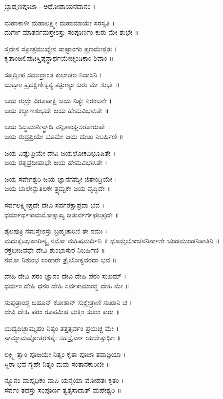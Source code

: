 ಬ್ರಾಹ್ಮಣಪೂಜಾ - ಅಥೋಪಾಯನದಾನಂ ।

ಮಹಾಕಾಳೀ ಮಹಾಲಕ್ಷ್ಮೀ ಮಹಾಮಾಯೇ ಸರಸ್ವತಿ ।\\
ದುರ್ಗೇ ಮಾತರ್ನಮಸ್ತೇಽಸ್ತು ಸಂಪೂರ್ಣಂ ಕುರು ಮೇ ಶುಭೇ ॥

ಸ್ತವೇನ ಸ್ತೋತ್ರಮುಖ್ಯೇನ ಸಾಷ್ಟಾಂಗಂ ಪ್ರಣಮೇತ್ತತಃ ।\\
ಕೃತಾಂಜಲಿಪುಟಸ್ತಿಷ್ಠನ್ಪ್ರಾರ್ಥಯೇಚ್ಚಂಡಿಕಾಂ ಶಿವಾಂ ॥

ಸಪ್ತದ್ವೀಪ ಸಮುದ್ರಾಂತ ಕುಲಾಚಲ ನಿವಾಸಿನಿ ।\\
ಯದ್ಗಾಂ ಪ್ರದಕ್ಷಿಣೀಕೃತ್ಯ ತತ್ಪುಣ್ಯಂ ಕುರು ಮೇ ಶುಭೇ ॥

ಜಯ ರುದ್ರೇ ವಿರೂಪಾಕ್ಷಿ ಜಯ ನಿತ್ಯೇ ನಿರಂಜನೇ ।\\ಜಯ ಕಲ್ಯಾಣಶುಭದೇ ಜಯ ಹೇಮವಿಭಾಸಿತೇ ॥

ಜಯ ಸಿದ್ಧಮುನೀನ್ದ್ರಾದಿ ವನ್ದಿತಾಂಘ್ರಿಸರೋರುಹೇ ।\\ಜಯ ರುದ್ರಪ್ರಿಯೇ ಭೂಮೇ ಜಯ ದುಃಖ ನಿಬರ್ಹಿಣಿ ॥

ಜಯ ವಿಷ್ಣುಪ್ರಿಯೇ ದೇವಿ ಜಯಲೋಕವಿಭೂಷಿತೇ ।\\ ಜಯ ರತ್ನಪ್ರದೀಪಾಭೇ ಜಯ ಹೇಮವಿಭಾಸಿತೇ ।

ಜಯ ಸರ್ವೇಶ್ವರಿ ಜಯ ಜ್ಞಾನಗಮ್ಯೇ ಜಿತೇಂದ್ರಿಯೇ ।\\ ಜಯ ಬಾಲೇನ್ದುತಿಲಕೇ ತ್ರ್ಯಮ್ಬಕೇ ಜಯ ವೃದ್ಧಿದೇ ॥

ಸರ್ವಲಕ್ಷ್ಮೀಪ್ರದೇ ದೇವಿ ಸರ್ವರಕ್ಷಾಪ್ರದಾ ಭವ ।\\ಧರ್ಮಾರ್ಥಕಾಮಮೋಕ್ಷಾಖ್ಯ ಚತುರ್ವರ್ಗಫಲಪ್ರದೇ ॥

ಶೈಲಪುತ್ರಿ ನಮಸ್ತೇಽಸ್ತು ಬ್ರಹ್ಮಚಾರಿಣಿ ತೇ ನಮಃ ।\\ಮಧುಕೈಟಭಹಾರಿಣ್ಯೈ ನಮೋ ಮಹಿಷಮರ್ದಿನಿ ॥
\newpage
ಧೂಮ್ರಲೋಚನನಿರ್ನಾಶೇ ಚಂಡಮುಂಡನಿಪಾತಿನಿ ॥\\ ರಕ್ತಬೀಜವಧೇ ದೇವಿ ಶುಂಭಾಸುರ ನಿಬರ್ಹಿಣಿ ॥\\
ನಮೋ ನಿಶುಂಭ ಸಂಹಾರೇ ತ್ರೈಲೋಕ್ಯವರದಾ ಭವ ॥

ದೇಹಿ ದೇವಿ  ಪರಂ ಜ್ಞಾನಂ ದೇವಿ ದೇಹಿ ಪರಂ ಸುಖಮ್ ।\\ಧರ್ಮಂ ದೇಹಿ ಧನಂ ದೇಹಿ ಸರ್ವಕಾಮಾಂಶ್ಚ ದೇಹಿ ಮೇ ॥

ಸುಪುತ್ರಾಂಶ್ಚ ಬಹೂನ್ ಕೋಶಾನ್ ಸುಕ್ಷೇತ್ರಾಣಿ ಸುಖಾನಿ ಚ ।\\ದೇವಿ ದೇಹಿ ಪರಂ ರೂಪಮಿಹ ಭುಕ್ತಿಂ ಸುಖಂ ಕುರು ॥

ಯದ್ಯದಿಚ್ಛಾಮ್ಯಹಂ ನಿತ್ಯಂ ತತ್ತತ್ಸರ್ವಂ ಪ್ರಯಚ್ಛ ಮೇ ।\\ನಾಮ್ನಾಮಷ್ಟೋತ್ತರಶತೈಃ ಸಹಸ್ರೈರ್ವಾ ಯಜೇತ್ಸುಧೀಃ ॥

ಲಕ್ಷ್ಮಿ ತ್ವಾಂ ಪೂಜಯೇ ನಿತ್ಯಂ ಕೃತಾ ಪೂಜಾ ತವಾಜ್ಞಯಾ । \\ಸ್ಥಿರಾ ಭವ ಗೃಹೇ ನಿತ್ಯಂ ಮಮ ಸಂತಾನಕಾರಿಣೀ ॥

ನ್ಯೂನಂ ವಾಪ್ಯಧಿಕಂ ವಾಪಿ ಯನ್ಮಯಾ ಮೋಹತಃ ಕೃತಂ ।\\ಸರ್ವಂ ತದಸ್ತು ಸಂಪೂರ್ಣ ತ್ವತ್ಪ್ರಸಾದಾತ್ ಮಹೇಶ್ವರಿ ॥

